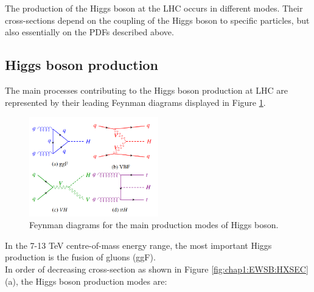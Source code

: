 The production of the Higgs boson at the LHC occurs in different modes. Their cross-sections depend on the coupling of the Higgs boson to specific particles, but also essentially on the PDFs described above.

\subsection{Higgs boson production}
\label{chap1:EWSB:HP}
The main processes contributing to the Higgs boson production at LHC are represented by their leading Feynman diagrams displayed in Figure \ref{fig:chap1:EWSB:HP}. 
\begin{figure}[htbp]
    \centering
    \includegraphics[width=0.5\textwidth]{Ch1/Img/Higgs_prod_modes.png}
    \caption{Feynman diagrams for the main production modes of Higgs boson.}
    \label{fig:chap1:EWSB:HP}
\end{figure}
In the 7-13 TeV centre-of-mass energy range, the most important Higgs production is the fusion of gluons (ggF).\\
In order of decreasing cross-section as shown in Figure \ref{fig:chap1:EWSB:HXSEC} (a), the Higgs boson production modes are:
